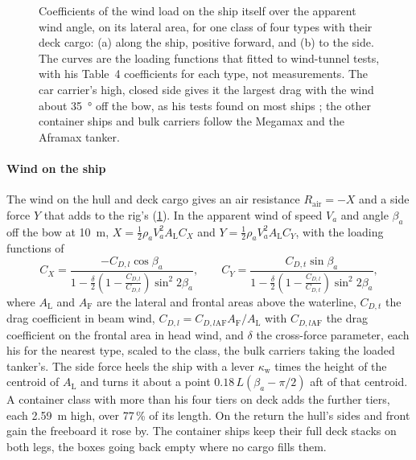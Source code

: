 \begin{figure}[tbp]
\centering
{}
\caption{Coefficients of the wind load on the ship itself over the apparent wind angle, on its lateral area, for one class of four types with their deck cargo: (a) along the ship, positive forward, and (b) to the side. The curves are the loading functions that \citet{blendermann1993} fitted to wind-tunnel tests, with his Table~4 coefficients for each type, not measurements. The car carrier's high, closed side gives it the largest drag with the wind about \SI{35}{\degree} off the bow, as his tests found on most ships \citep[p.~12]{blendermann1993}; the other container ships and bulk carriers follow the Megamax and the Aframax tanker.}
\label{fig:wind_load}
\end{figure}

\paragraph{Wind on the ship} The wind on the hull and deck cargo gives an air resistance $R_\mathrm{air}=-X$ and a side force $Y$ that adds to the rig's (\cref{fig:wind_load}). In the apparent wind of speed $V_a$ and angle $\beta_a$ off the bow at \SI{10}{m}, $X = \tfrac12\rho_a V_a^2 A_\mathrm{L} C_X$ and $Y = \tfrac12\rho_a V_a^2 A_\mathrm{L} C_Y$, with the loading functions of \citet{blendermann1993}
\begin{equation}
C_X = \frac{-C_{D,l}\cos\beta_a}{1-\tfrac{\delta}{2}\left(1-\tfrac{C_{D,l}}{C_{D,t}}\right)\sin^2 2\beta_a}, \qquad
C_Y = \frac{C_{D,t}\sin\beta_a}{1-\tfrac{\delta}{2}\left(1-\tfrac{C_{D,l}}{C_{D,t}}\right)\sin^2 2\beta_a},
\end{equation}
where $A_\mathrm{L}$ and $A_\mathrm{F}$ are the lateral and frontal areas above the waterline, $C_{D,t}$ the drag coefficient in beam wind, $C_{D,l}=C_{D,l\mathrm{AF}}A_\mathrm{F}/A_\mathrm{L}$ with $C_{D,l\mathrm{AF}}$ the drag coefficient on the frontal area in head wind, and $\delta$ the cross-force parameter, each his for the nearest type, scaled to the class, the bulk carriers taking the loaded tanker's. The side force heels the ship with a lever $\kappa_\mathrm{w}$ times the height of the centroid of $A_\mathrm{L}$ and turns it about a point $0.18\,L(\beta_a-\pi/2)$ aft of that centroid. A container class with more than his four tiers on deck adds the further tiers, each \SI{2.59}{m} high, over 77\,\% of its length. On the return the hull's sides and front gain the freeboard it rose by. The container ships keep their full deck stacks on both legs, the boxes going back empty where no cargo fills them.

